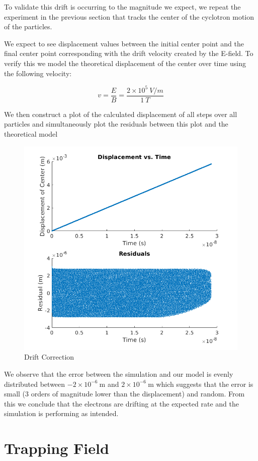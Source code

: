 \documentclass[12pt,letterpaper]{article}
\begin{document}
To validate this drift is occurring to the magnitude we expect, we repeat the experiment in the previous section that tracks the center of the cyclotron motion of the particles. 

We expect to see displacement values between the initial center point and the final center point corresponding with the drift velocity created by the E-field. To verify this we model the theoretical displacement of the center over time using the following velocity:

\[ v = \frac{E}{B} = \frac{2\times10^5~V/m}{1~T} \]

We then construct a plot of the calculated displacement of all steps over all particles and simultaneously plot the residuals between this plot and the theoretical model

    \begin{figure}[H]
    \centering
    \includegraphics[width=0.9\linewidth]{img/drift.png}
    \caption{Drift Correction}
    \end{figure}

We observe that the error between the simulation and our model is evenly distributed between $-2\times10^{-6}~$m and $2\times10^{-6}~$m which suggests that the error is small (3 orders of magnitude lower than the displacement) and random. From this we conclude that the electrons are drifting at the expected rate and the simulation is performing as intended.

\section{Trapping Field}
\end{document}
